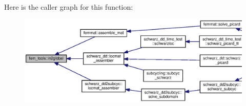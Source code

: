 Here is the caller graph for this function\+:\nopagebreak
\begin{figure}[H]
\begin{center}
\leavevmode
\includegraphics[width=350pt]{namespacefem__tools_a70a2c3916a63fabc299dbbb53741e122_icgraph}
\end{center}
\end{figure}


